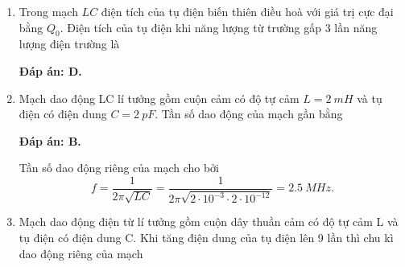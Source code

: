 \begin{enumerate}[label=\bfseries Câu \arabic*:]
{		
		
	}
	\item {}
	
	{
		Trong mạch $LC$ điện tích của tụ điện biến thiên điều hoà với giá trị cực đại bằng $Q_0$. Điện tích của tụ điện khi năng lượng từ trường gấp 3 lần năng lượng điện trường là
		
	}
	
	\hideall
	{		\textbf{Đáp án: D.}
		
		
		
	}
	
	\item {}
	
	{Mạch dao động LC lí tưởng gồm cuộn cảm có độ tự cảm $L = \SI{2}{mH}$ và tụ điện có điện dung $C = \SI{2}{pF}$. Tần số dao động của mạch gần bằng
	}
	
	\hideall
	{		\textbf{Đáp án: B.}
		
		Tần số dao động riêng của mạch cho bởi
		$$
		f = \dfrac{1}{2\pi \sqrt{LC}} = \dfrac{1}{2\pi \sqrt{2\cdot 10^{-3} \cdot 2\cdot 10^{-12}}} = \SI{2,5}{MHz}.
		$$
		
	}
	
	
	\item {}
	
	{Mạch dao động điện từ lí tưởng gồm cuộn dây thuần cảm có độ tự cảm L và tụ điện có điện dung C. Khi tăng điện dung của tụ điện lên 9 lần thì chu kì dao động riêng của mạch
	}
	

\end{enumerate}
